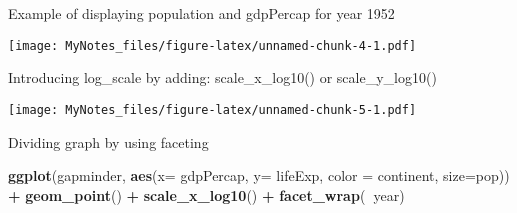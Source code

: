 \documentclass[]{article}
\newenvironment{Shaded}{\begin{snugshade}}{\end{snugshade}}
\newcommand{\KeywordTok}[1]{\textcolor[rgb]{0.13,0.29,0.53}{\textbf{#1}}}
\newcommand{\DataTypeTok}[1]{\textcolor[rgb]{0.13,0.29,0.53}{#1}}
\newcommand{\DecValTok}[1]{\textcolor[rgb]{0.00,0.00,0.81}{#1}}
\newcommand{\StringTok}[1]{\textcolor[rgb]{0.31,0.60,0.02}{#1}}
\newcommand{\CommentTok}[1]{\textcolor[rgb]{0.56,0.35,0.01}{\textit{#1}}}
\newcommand{\OperatorTok}[1]{\textcolor[rgb]{0.81,0.36,0.00}{\textbf{#1}}}
\newcommand{\NormalTok}[1]{#1}
\begin{document}
Example of displaying population and gdpPercap for year 1952

\begin{Shaded}
\end{Shaded}

\texttt{[image: MyNotes\_files/figure-latex/unnamed-chunk-4-1.pdf]}

Introducing log\_scale by adding: scale\_x\_log10() or scale\_y\_log10()

\begin{Shaded}
\end{Shaded}

\texttt{[image: MyNotes\_files/figure-latex/unnamed-chunk-5-1.pdf]}

Dividing graph by using faceting

\begin{Shaded}
\begin{Highlighting}[]
\KeywordTok{ggplot}\NormalTok{(gapminder, }\KeywordTok{aes}\NormalTok{(}\DataTypeTok{x=}\NormalTok{ gdpPercap, }\DataTypeTok{y=}\NormalTok{ lifeExp, }\DataTypeTok{color =}\NormalTok{ continent, }\DataTypeTok{size=}\NormalTok{pop)) }\OperatorTok{+}\StringTok{ }\KeywordTok{geom_point}\NormalTok{() }\OperatorTok{+}\StringTok{ }\KeywordTok{scale_x_log10}\NormalTok{() }\OperatorTok{+}\StringTok{ }\KeywordTok{facet_wrap}\NormalTok{(}\OperatorTok{~}\NormalTok{year)}
\end{Highlighting}
\end{Shaded}
\end{document}
